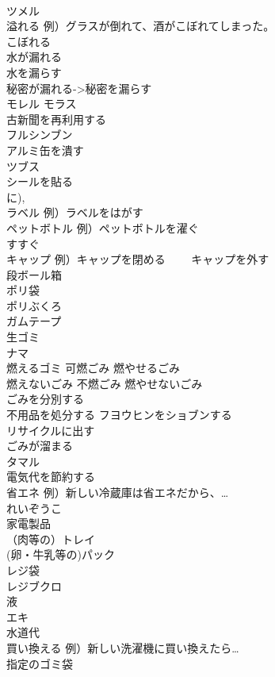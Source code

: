 \documentclass[8pt]{extreport}
\begin{document}
\begin{CJK}{UTF8}{min}
\\	ツメル
\\	溢れる 例）グラスが倒れて、酒がこぼれてしまった。	
\\	こぼれる
\\	水が漏れる 
\\	水を漏らす 
\\	秘密が漏れる->秘密を漏らす	
\\	モレル モラス
\\	古新聞を再利用する	
\\	フルシンブン
\\	アルミ缶を潰す	
\\	ツブス
\\	シールを貼る	
\\	に), 
\\	ラベル 例）ラベルをはがす	
\\	ペットボトル 例）ペットボトルを濯ぐ	
\\	すすぐ
\\	キャップ 例）キャップを閉める 　　キャップを外す	
\\	段ボール箱	
\\	ポリ袋	
\\	ポリぶくろ
\\	ガムテープ	
\\	生ゴミ	
\\	ナマ
\\	燃えるゴミ 可燃ごみ 燃やせるごみ	
\\	燃えないごみ 不燃ごみ 燃やせないごみ	
\\	ごみを分別する	
\\	不用品を処分する	フヨウヒンをショブンする 
\\	リサイクルに出す	
\\	ごみが溜まる	
\\	タマル
\\	電気代を節約する	
\\	省エネ 例）新しい冷蔵庫は省エネだから、…	
\\	れいぞうこ
\\	家電製品	
\\	（肉等の）トレイ	
\\	(卵・牛乳等の)パック	
\\	レジ袋	
\\	レジブクロ
\\	液	
\\	エキ
\\	水道代	
\\	買い換える 例）新しい洗濯機に買い換えたら…	
\\	指定のゴミ袋	

\end{CJK}
\end{document}
